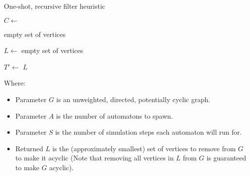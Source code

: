 \documentclass{article}
\begin{document}
\begin{algorithm}
  \caption{One-shot, recursive filter heuristic}\label{alg:one-shot-recursive}
  \begin{algorithmic}[1]
    \State $C \gets$ 

    \State \Return empty set of vertices 
    \EndIf

    \State $L \gets$ empty set of vertices

     
    \State $T' \gets$ 
    \EndFor
    \State \Return $L$
    \EndFunction
  \end{algorithmic}
\end{algorithm}

\FloatBarrier

\noindent Where:
\begin{itemize}
  \item[] Parameter $G$ is an unweighted, directed, potentially cyclic graph.
  \item[] Parameter $A$ is the number of automatons to spawn.
  \item[] Parameter $S$ is the number of simulation steps each automaton will run for.
  \item[] Returned $L$ is the (approximately smallest) set of vertices to remove from $G$ to make it acyclic (Note that removing all vertices in $L$ from $G$ is guaranteed to make $G$ acyclic).
\end{itemize}
\end{document}
